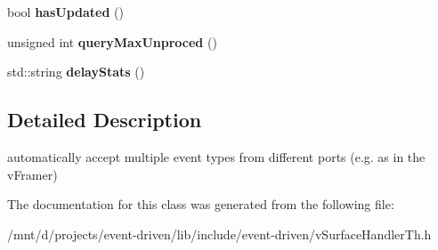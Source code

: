 \begin{DoxyCompactItemize}
\mbox{\label{classev_1_1syncvstreams_adff155da0d9cf739725127c446b1e575}} 
bool {\bfseries has\+Updated} ()
\item 
\mbox{\label{classev_1_1syncvstreams_a481bbbc4b4a0b4d7721e630da92de71c}} 
unsigned int {\bfseries query\+Max\+Unproced} ()
\item 
\mbox{\label{classev_1_1syncvstreams_a40bb750373f2b6d406e57bbd70bc40b1}} 
std\+::string {\bfseries delay\+Stats} ()
\end{DoxyCompactItemize}


\subsection{Detailed Description}
automatically accept multiple event types from different ports (e.\+g. as in the v\+Framer) 

The documentation for this class was generated from the following file\+:\begin{DoxyCompactItemize}
\item 
/mnt/d/projects/event-\/driven/lib/include/event-\/driven/v\+Surface\+Handler\+Th.\+h\end{DoxyCompactItemize}
